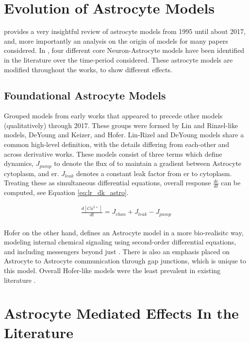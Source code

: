     \section{Evolution of Astrocyte Models}
    \parencite{manninen_2018} provides a very insightful review of astrocyte models
    from 1995 until about 2017, and, more importantly an analysis on the origin
    of models for many papers considered. In \parencite{manninen_2018}, four different core
    Neuron-Astrocyte models have been identified in the literature over the
    time-period considered. These astrocyte models are modified throughout the
    works, to show different effects.

    \subsection{Foundational Astrocyte Models}
    \parencite{manninen_2018} Grouped models from early works that appeared to
    precede other models (qualitatively) through 2017. These groups were formed by
    Lin and Rinzel-like models, DeYoung and Keizer, and Hofer. Lin-Rizel and
    DeYoung models share a common high-level definition, with the details
    differing from each-other and across derivative works. These models consist
    of three terms which define \ca dynamics, $J_{pump}$ to denote the flux of
    \ca to maintain a gradient between Astrocyte cytoplasm, and
    \Gls{er}. $J_{leak}$ denotes a constant leak factor from \Gls{er} to
    cytoplasm. Treating these as simultaneous differential equations, overall
    \ca response $\frac{dc}{dt}$ can be computed, see Equation
    \ref{eq:lr_dk_astro}.

    \begin{align}
      \frac{d[Ca^{2+}]}{dt} = J_{chan} + J_{leak} -
      J_{pump} \label{eq:lr_dk_astro} \\
    \end{align}

    Hofer on the other hand, defines an Astrocyte model in a more bio-realisitc
    way, modeling internal chemical signaling using second-order differential
    equations, and including messengers beyond just \ipt. There is also an
    emphasis placed on Astrocyte to Astrocyte communication through gap
    junctions, which is unique to this model. Overall Hofer-like models were the
    least prevalent in existing literature \parencite{manninen_2018}.

    
    \section{Astrocyte Mediated Effects In the Literature}
